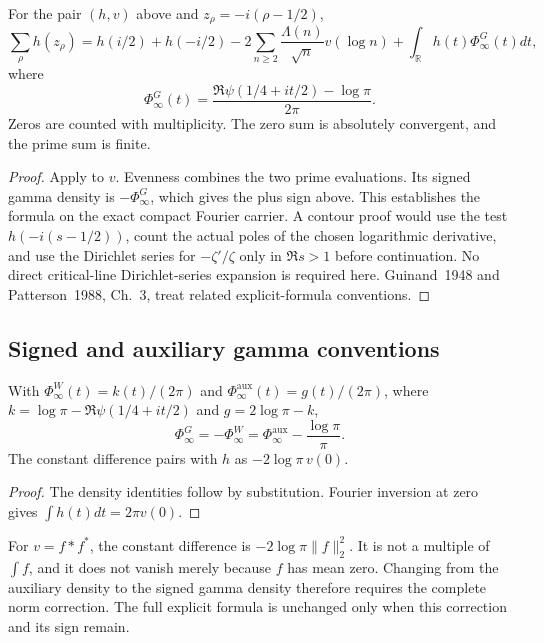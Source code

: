 \begin{theorem}
\label{v4-arith:w7-i:thm:guinand-explicit}
For the pair $(h,v)$ above and $z_\rho=-i(\rho-1/2)$,
\begin{equation}
\label{v4-arith:w7-i:eq:guinand}
 \sum_\rho h(z_\rho)=h(i/2)+h(-i/2)
 -2\sum_{n\ge2}\frac{\Lambda(n)}{\sqrt n}v(\log n)
 +\int_{\mathbb R}h(t)\Phi_\infty^G(t)dt,
\end{equation}
where
\begin{equation}
\label{v4-arith:w7-i:eq:guinand-arch}
 \Phi_\infty^G(t)=\frac{\Re\psi(1/4+it/2)-\log\pi}{2\pi}.
\end{equation}
Zeros are counted with multiplicity. The zero sum is absolutely
convergent, and the prime sum is finite.
\end{theorem}
\begin{proof}
Apply  to $v$.
Evenness combines the two prime evaluations. Its signed gamma
density is $-\Phi_\infty^G$, which gives the plus sign above.
This establishes the formula on the exact compact Fourier carrier.
A contour proof would use the test $h(-i(s-1/2))$, count the
actual poles of the chosen logarithmic derivative, and use the
Dirichlet series for $-\zeta'/\zeta$ only in $\Re s>1$ before
continuation. No direct critical-line Dirichlet-series expansion
is required here. Guinand~1948 and Patterson~1988, Ch.~3, treat
related explicit-formula conventions.
\end{proof}

\subsection{Signed and auxiliary gamma conventions}
\label{v4-arith:w7-i:guinand:sign-convention}
\begin{proposition}
\label{v4-arith:w7-i:prop:weil-vs-guinand}
With $\Phi_\infty^W(t)=k(t)/(2\pi)$ and
$\Phi_\infty^{\mathrm{aux}}(t)=g(t)/(2\pi)$, where
$k=\log\pi-\Re\psi(1/4+it/2)$ and $g=2\log\pi-k$,
\begin{equation}
\label{v4-arith:w7-i:eq:weil-guinand-dictionary}
 \Phi_\infty^G=-\Phi_\infty^W
 =\Phi_\infty^{\mathrm{aux}}-\frac{\log\pi}{\pi}.
\end{equation}
The constant difference pairs with $h$ as $-2\log\pi\,v(0)$.
\end{proposition}
\begin{proof}
The density identities follow by substitution. Fourier inversion
at zero gives $\int h(t)dt=2\pi v(0)$.
\end{proof}
\begin{remark}
\label{v4-arith:w7-i:rem:constant-shift}
For $v=f*f^*$, the constant difference is
$-2\log\pi\|f\|_2^2$. It is not a multiple of $\int f$, and
it does not vanish merely because $f$ has mean zero.
Changing from the auxiliary density to the signed gamma density
therefore requires the complete norm correction. The full explicit
formula is unchanged only when this correction and its sign remain.
\end{remark}

